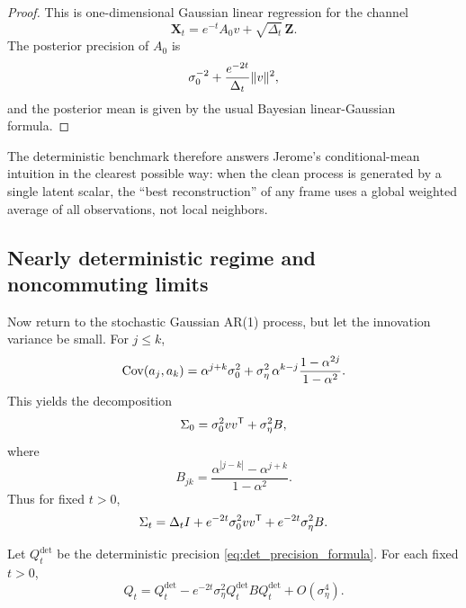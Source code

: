 \documentclass[11pt]{article}
\begin{document}
\begin{proof}
This is one-dimensional Gaussian linear regression for the channel
\begin{equation}
 \mathbf X_t=e^{-t}A_0v+\sqrt{\Delta_t}\,\mathbf Z.
\end{equation}
The posterior precision of $A_0$ is
\begin{equation}
 \sigma_0^{-2}+\frac{e^{-2t}}{\Delta_t}\lVert v\rVert^2,
\end{equation}
and the posterior mean is given by the usual Bayesian linear-Gaussian formula.
\end{proof}

The deterministic benchmark therefore answers Jerome's conditional-mean intuition in the clearest possible way: when the clean process is generated by a single latent scalar, the ``best reconstruction'' of any frame uses a global weighted average of all observations, not local neighbors.

\subsection{Nearly deterministic regime and noncommuting limits}

Now return to the stochastic Gaussian AR(1) process, but let the innovation variance be small. For $j\leq k$,
\begin{equation}\label{eq:cov_small_sigma_eta}
 \operatorname{Cov}(a_j,a_k)=\alpha^{j+k}\sigma_0^2+
 \sigma_\eta^2\,\alpha^{k-j}\frac{1-\alpha^{2j}}{1-\alpha^2}.
\end{equation}
This yields the decomposition
\begin{equation}\label{eq:cov_decomp_small_sigma}
 \Sigma_0=\sigma_0^2vv^{\mathsf{T}}+\sigma_\eta^2 B,
\end{equation}
where
\begin{equation}
 B_{jk}=\frac{\alpha^{|j-k|}-\alpha^{j+k}}{1-\alpha^2}.
\end{equation}
Thus for fixed $t>0$,
\begin{equation}
 \Sigma_t=\Delta_tI+e^{-2t}\sigma_0^2vv^{\mathsf{T}}+e^{-2t}\sigma_\eta^2B.
\end{equation}

\begin{proposition}\label{prop:small_sigma_eta}
Let $Q_t^{\mathrm{det}}$ be the deterministic precision \eqref{eq:det_precision_formula}. For each fixed $t>0$,
\begin{equation}\label{eq:small_sigma_eta_expansion}
 Q_t=Q_t^{\mathrm{det}}-e^{-2t}\sigma_\eta^2Q_t^{\mathrm{det}}BQ_t^{\mathrm{det}}+O(\sigma_\eta^4).
\end{equation}
\end{proposition}
\end{document}
